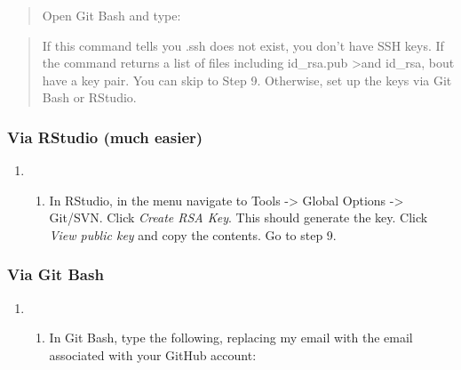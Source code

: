 \documentclass[12pt,]{article}
\providecommand{\tightlist}{%
  \setlength{\itemsep}{0pt}\setlength{\parskip}{0pt}}
\begin{document}
\begin{quote}
Open Git Bash and type:
\end{quote}

\begin{quote}
\colorbox{light-gray}{}
\end{quote}

\begin{quote}
If this command tells you .ssh does not exist, you don't have SSH keys.
If the command returns a list of files including id\_rsa.pub
\textgreater{}and id\_rsa, bout have a key pair. You can skip to Step 9.
Otherwise, set up the keys via Git Bash or RStudio.
\end{quote}

\subsubsection{Via RStudio (much easier)}\label{via-rstudio-much-easier}

\begin{enumerate}
\def\labelenumi{\arabic{enumi}.}
\setcounter{enumi}{5}
\item
  \begin{enumerate}
  \def\labelenumii{\alph{enumii}.}
  \tightlist
  \item
    In RStudio, in the menu navigate to Tools -\textgreater{} Global
    Options -\textgreater{} Git/SVN. Click \emph{Create RSA Key}. This
    should generate the key. Click \emph{View public key} and copy the
    contents. Go to step 9.
  \end{enumerate}
\end{enumerate}

\subsubsection{Via Git Bash}\label{via-git-bash}

\begin{enumerate}
\def\labelenumi{\arabic{enumi}.}
\setcounter{enumi}{5}
\item
  \begin{enumerate}
  \def\labelenumii{\alph{enumii}.}
  \setcounter{enumii}{1}
  \tightlist
  \item
    In Git Bash, type the following, replacing my email with the email
    associated with your GitHub account:
  \end{enumerate}
\end{enumerate}
\end{document}
